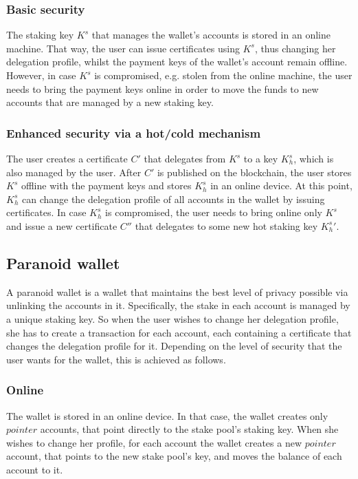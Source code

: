 \subsubsection{Basic security}

The staking key $K^s$ that manages the wallet's accounts is stored in an online machine. That way, the user can issue certificates using $K^s$, thus changing her delegation profile, whilst the payment keys of the wallet's account remain offline. However, in case $K^s$ is compromised, e.g. stolen from the online machine, the user needs to bring the payment keys online in order to move the funds to new accounts that are managed by a new staking key.

\subsubsection{Enhanced security via a hot/cold mechanism}

The user creates a certificate $C'$ that delegates from $K^s$ to a key $K^s_h$, which is also managed by the user. After $C'$ is published on the blockchain, the user stores $K^s$ offline with the payment keys and stores $K^s_h$ in an online device. At this point, $K^s_h$ can change the delegation profile of all accounts in the wallet by issuing certificates. In case $K^s_h$ is compromised, the user needs to bring online only $K^s$ and issue a new certificate $C''$ that delegates to some new hot staking key ${K^s_h}'$.

\subsection{Paranoid wallet}

A paranoid wallet is a wallet that maintains the best level of privacy possible via unlinking the accounts in it. Specifically, the stake in each account is managed by a unique staking key. So when the user wishes to change her delegation profile, she has to create a transaction for each account, each containing a certificate that changes the delegation profile for it. Depending on the level of security that the user wants for the wallet, this is achieved as follows.

\subsubsection{Online}

The wallet is stored in an online device. In that case, the wallet creates only $pointer$ accounts, that point directly to the stake pool's staking key. When she wishes to change her profile, for each account the wallet creates a new $pointer$ account, that points to the new stake pool's key, and moves the balance of each account to it.

